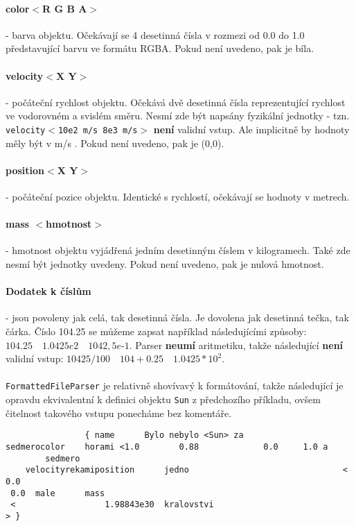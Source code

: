 \paragraph{color$ < $R G B A$ > $} - barva objektu. Očekávají se 4 desetinná čísla v rozmezi od 0.0 do 1.0 představující barvu ve formátu RGBA. Pokud není uvedeno, pak je bíla.
\paragraph{velocity$ < $X Y$ > $} - počáteční rychlost objektu. Očekává dvě desetinná čísla reprezentující rychlost ve vodorovném a svislém směru. Nesmí zde být napsány fyzikální jednotky - tzn. \texttt{velocity$ < $10e2 m/s 8e3 m/s$ > $} \textbf{není} validní vstup. Ale implicitně by hodnoty měly být v m/s . Pokud není uvedeno, pak je (0,0).
\paragraph{position$ < $X Y$ > $} - počáteční pozice objektu. Identické s rychlostí, očekávají se hodnoty v metrech.
\paragraph{mass $ < $hmotnost$ > $ } - hmotnost objektu vyjádřená jedním desetinným číslem v kilogramech. Také zde nesmí být jednotky uvedeny. Pokud není uvedeno, pak je nulová hmotnost.
\paragraph{Dodatek k číslům} - jsou povoleny jak celá, tak desetinná čísla. Je dovolena jak desetinná tečka, tak čárka. Číslo 104.25 se můžeme zapsat například následujícími způsoby: $ 104.25 \quad 1.0425e2 \quad 1042,5e\text{-}1 $.
Parser \textbf{neumí} aritmetiku, takže následující \textbf{není} validní vstup: $ 10425/100 \quad 104 + 0.25 \quad 1.0425 * 10^2 $.
\paragraph{}
\texttt{FormattedFileParser} je relativně shovívavý k formátování, takže následující je opravdu ekvivalentní k definici objektu \texttt{Sun} z předchozího příkladu, ovšem čitelnost takového vstupu ponecháme bez komentáře. 
\begin{lstlisting}
				{ name		Bylo nebylo	<Sun> za 
sedmerocolor	horami <1.0 	   0.88 			0.0 	1.0 a
 		sedmero
	velocityrekamiposition		jedno								<
0.0 
 0.0  male 		mass	
 <					1.98843e30  kralovstvi
> }

\end{lstlisting}

